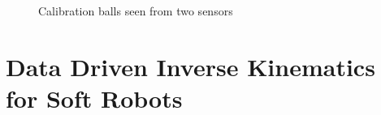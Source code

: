 \documentclass[letterpaper, 10 pt, conference]{ieeeconf}  %
\begin{document}
 \begin{figure}[thpb]
        \centering
        \caption{Calibration balls seen from two sensors}
        \label{fig:calib}
\end{figure}


   
\section{Data Driven Inverse Kinematics for Soft Robots}
\end{document}
